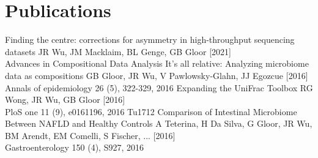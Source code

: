 \documentclass[]{twentysecondcv}
\begin{document}
\section{Publications}
\vspace{-10px}

\begin{twenty}
  \twentyitem
    {Finding the centre: corrections for asymmetry in high-throughput sequencing datasets}
    {JR Wu, JM Macklaim, BL Genge, GB Gloor}
    {[2021] \\}
    {Advances in Compositional Data Analysis}
  \twentyitem
    {It's all relative: Analyzing microbiome data as compositions}
    {GB Gloor, JR Wu, V Pawlowsky-Glahn, JJ Egozcue}
    {[2016] \\}
    {Annals of epidemiology 26 (5), 322-329, 2016}
  \twentyitem
    {Expanding the UniFrac Toolbox}
    {RG Wong, JR Wu, GB Gloor}
    {[2016] \\}
    {PloS one 11 (9), e0161196, 2016}
  \twentyitem
    {Tu1712 Comparison of Intestinal Microbiome Between NAFLD and Healthy Controls}
    {A Teterina, H Da Silva, G Gloor, JR Wu, BM Arendt, EM Comelli, S Fischer, ...}
    {[2016] \\}
    {Gastroenterology 150 (4), S927, 2016}
\end{twenty}
\vspace{-10px}

\end{document}
